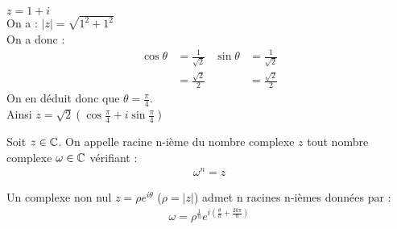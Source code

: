 \begin{exemple}
        $z = 1 + i$
        \\
        On a : $|z| = \sqrt{1^2 + 1^2}$
        \\
        On a donc :
        \begin{align*}
            \cos{\theta} &= \frac{1}{\sqrt{2}} & \sin{\theta} &= \frac{1}{\sqrt{2}} \\
                         &= \frac{\sqrt{2}}{2} &              &= \frac{\sqrt{2}}{2}
        \end{align*}
        On en déduit donc que $\theta = \frac{\pi}{4}$. \\
        Ainsi $z = \sqrt{2}\left(\cos{\frac{\pi}{4}} + i\sin{\frac{\pi}{4}}\right)$
    \end{exemple}



    \begin{graybox}
    \begin{definition}
    Soit $z \in \mathbb{C}$. On appelle racine n-ième du nombre complexe $z$ tout nombre complexe $\omega \in \mathbb{C}$ vérifiant :
    \begin{align*}
        \omega^n = z 
    \end{align*}
\end{definition}
    \end{graybox}

\begin{graybox}
\begin{proposition}
Un complexe non nul $z = \rho e^{i\theta}$ ($\rho = |z|$) admet n racines n-ièmes données par :
    \begin{align*}
        \omega = \rho^{\frac{1}{n}} e^{i\left(\frac{\theta}{n} + \frac{2k\pi}{n} \right)} 
    \end{align*}
\end{proposition}
\end{graybox}

